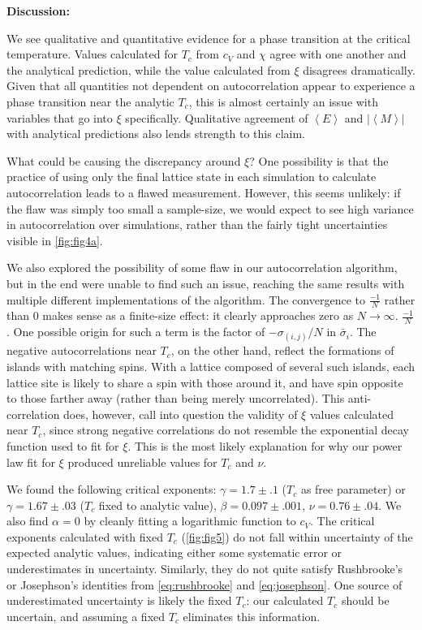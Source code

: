 \documentclass[letter,scriptaddress,twocolumn, prl,nofootinbib]{revtex4}
\newcommand{\submin}[1]{\left\langle #1 \right\rangle}
\begin{document}
\textbf{Discussion:}

We see qualitative and quantitative evidence for a phase transition at the critical temperature. Values calculated for $T_c$ from $c_V$ and $\chi$ agree with one another and the analytical prediction, while the value calculated from $\xi$ disagrees dramatically. Given that all quantities not dependent on autocorrelation appear to experience a phase transition near the analytic $T_c$, this is almost certainly an issue with variables that go into $\xi$ specifically. Qualitative agreement of $\submin{E}$ and $|\submin{M}|$ with analytical predictions also lends strength to this claim.

What could be causing the discrepancy around $\xi$? One possibility is that the practice of using only the final lattice state in each simulation to calculate autocorrelation leads to a flawed measurement. However, this seems unlikely: if the flaw was simply too small a sample-size, we would expect to see high variance in autocorrelation over simulations, rather than the fairly tight uncertainties visible in \autoref{fig:fig4a}.

We also explored the possibility of some flaw in our autocorrelation algorithm, but in the end were unable to find such an issue, reaching the same results with multiple different implementations of the algorithm. The convergence to $\frac{-1}{N}$ rather than $0$ makes sense as a finite-size effect: it clearly approaches zero as $N \rightarrow \infty$. $\frac{-1}{N}$. One possible origin for such a term is the factor of $-\sigma_{(i, j)}/N$ in $\bar{\sigma}_i$. The negative autocorrelations near $T_c$, on the other hand, reflect the formations of islands with matching spins. With a lattice composed of several such islands, each lattice site is likely to share a spin with those around it, and have spin opposite to those farther away (rather than being merely uncorrelated). This anti-correlation does, however, call into question the validity of $\xi$ values calculated near $T_c$, since strong negative correlations do not resemble the exponential decay function used to fit for $\xi$. This is the most likely explanation for why our power law fit for $\xi$ produced unreliable values for $T_c$ and $\nu$.

We found the following critical exponents: $\gamma = 1.7 \pm .1$ ($T_c$ as free parameter) or $\gamma = 1.67 \pm .03$ ($T_c$ fixed to analytic value), $\beta = 0.097 \pm .001$, $\nu = 0.76 \pm .04$. We also find $\alpha = 0$ by cleanly fitting a logarithmic function to $c_V$. The critical exponents calculated with fixed $T_c$ (\autoref{fig:fig5}) do not fall within uncertainty of the expected analytic values, indicating either some systematic error or underestimates in uncertainty. Similarly, they do not quite satisfy Rushbrooke's or Josephson's identities from \autoref{eq:rushbrooke} and \autoref{eq:josephson}. One source of underestimated uncertainty is likely the fixed $T_c$: our calculated $T_c$ should be uncertain, and assuming a fixed $T_c$ eliminates this information.
\end{document}
